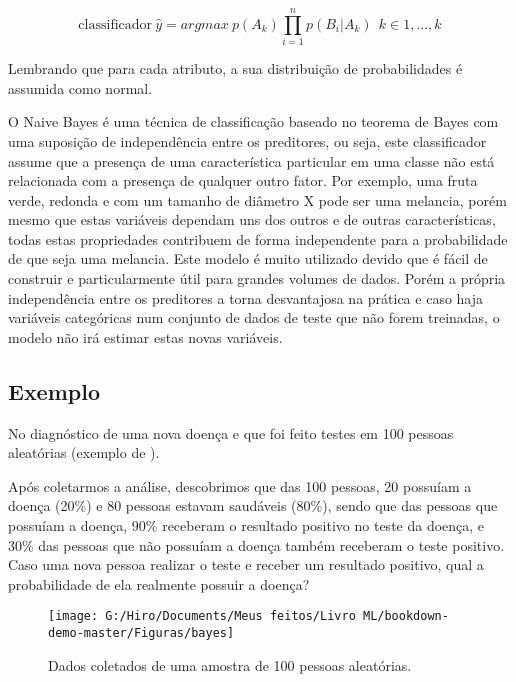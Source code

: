 \documentclass[
]{book}
\begin{document}
\begin{equation} 
  \mbox{classificador} \ \hat{y}=argmax \ p(A_k)\displaystyle \prod_{i=1}^n p(B_i|A_k) \ \ k ∈{1,...,k}
  \label{eq:naivebayes}
\end{equation}

Lembrando que para cada atributo, a sua distribuição de probabilidades é assumida como normal.

O Naive Bayes é uma técnica de classificação baseado no teorema de Bayes com uma suposição de independência entre os preditores, ou seja, este classificador assume que a presença de uma característica particular em uma classe não está relacionada com a presença de qualquer outro fator. Por exemplo, uma fruta verde, redonda e com um tamanho de diâmetro X pode ser uma melancia, porém mesmo que estas variáveis dependam uns dos outros e de outras características, todas estas propriedades contribuem de forma independente para a probabilidade de que seja uma melancia. Este modelo é muito utilizado devido que é fácil de construir e particularmente útil para grandes volumes de dados. Porém a própria independência entre os preditores a torna desvantajosa na prática e caso haja variáveis categóricas num conjunto de dados de teste que não forem treinadas, o modelo não irá estimar estas novas variáveis.

\hypertarget{exbayes}{%
\subsection{Exemplo}\label{exbayes}}

No diagnóstico de uma nova doença e que foi feito testes em 100 pessoas aleatórias (exemplo de \citet{organica}).

Após coletarmos a análise, descobrimos que das 100 pessoas, 20 possuíam a doença (20\%) e 80 pessoas estavam saudáveis (80\%), sendo que das pessoas que possuíam a doença, 90\% receberam o resultado positivo no teste da doença, e 30\% das pessoas que não possuíam a doença também receberam o teste positivo. Caso uma nova pessoa realizar o teste e receber um resultado positivo, qual a probabilidade de ela realmente possuir a doença?

\begin{figure}

{\centering \texttt{[image: G:/Hiro/Documents/Meus feitos/Livro ML/bookdown-demo-master/Figuras/bayes]} 

}

\caption{Dados coletados de uma amostra de 100 pessoas aleatórias.}\label{fig:bayes}
\end{figure}
\end{document}
